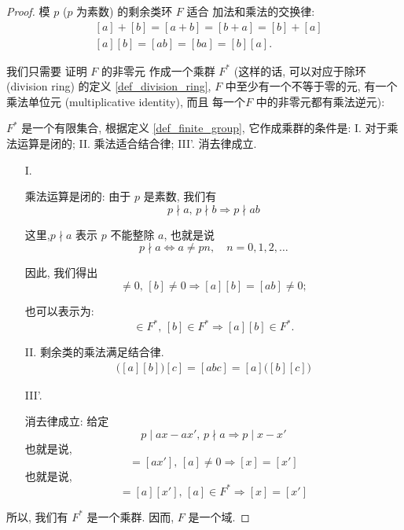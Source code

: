 \documentclass[utf8]{ctexbook}
\theoremstyle{definition}
\begin{document}
\begin{proof}
模 $p$ ($p$ 为素数) 的剩余类环 $F$ 适合 加法和乘法的交换律:
\begin{align*}
& [a] + [b] = [a+b] = [b+a]= [b] + [a] \\
& [a][b] = [ab] = [ba] = [b][a] .
\end{align*}

我们只需要 证明 $F$ 的非零元 作成一个乘群 $F^*$ (这样的话, 可以对应于除环 (division ring) 的定义 \ref{def_division_ring}, $F$ 中至少有一个不等于零的元, 有一个乘法单位元 (multiplicative identity), 而且 每一个$F$ 中的非零元都有乘法逆元):

$F^*$ 是一个有限集合, 根据定义 \ref{def_finite_group}, 它作成乘群的条件是: I. 对于乘法运算是闭的; II. 乘法适合结合律; III'. 消去律成立.
\begin{itemize}
\item[I.]{乘法运算是闭的: 由于 $p$ 是素数, 我们有
\begin{equation}
p \nmid a, \, p \nmid b \Rightarrow p \nmid ab
\end{equation}

这里,$p \nmid a $ 表示 $p$ 不能整除 $a$, 也就是说
\begin{equation}
p \nmid a \iff a \neq p n, \quad n = 0, 1, 2, \ldots
\end{equation}

因此, 我们得出
\begin{equation}
[a] \neq 0, \, [b] \neq 0 \Rightarrow [a][b] = [ab] \neq 0 ;
\end{equation}

也可以表示为:
\begin{equation}
[a] \in F^*, \, [b] \in F^* \Rightarrow [a] [b] \in F^* .
\end{equation}
}
\item[II.]{剩余类的乘法满足结合律.
\begin{align*}
\Big( [a][b] \Big) [c] = [abc] = [a] \Big( [b] [c] \Big)
\end{align*}
}
\item[III'.]{消去律成立: 给定
\begin{equation}
p \mid ax - a x' , \, p \nmid a \Rightarrow p \mid x - x' 
\end{equation}
也就是说,
\begin{equation}
[ax] = [ax'] , \, [a] \neq 0 \Rightarrow [x] = [x']
\end{equation}
也就是说,
\begin{equation}
[a][x] = [a] [x'] , \, [a] \in F^* \Rightarrow [x] = [x']
\end{equation}

}
\end{itemize}

所以, 我们有 $F^*$ 是一个乘群. 因而, $F$ 是一个域.
\end{proof}
\end{document}
